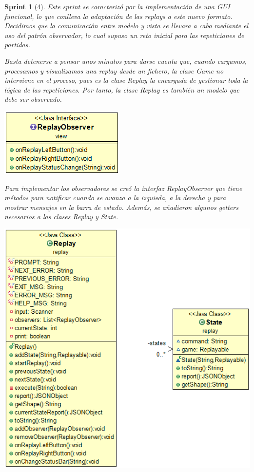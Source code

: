 \documentclass{article}
\theoremstyle{break}
\newtheorem*{sprint}{Sprint}
\begin{document}
\begin{sprint}[4]

Este sprint se caracterizó por la implementación de una GUI funcional, lo que conlleva la adaptación de las \textit{replays} a este nuevo formato. Decidimos que la comunicación entre modelo y vista se llevara a cabo mediante el uso del patrón observador, lo cual supuso un reto inicial para las repeticiones de partidas.

Basta detenerse a pensar unos minutos para darse cuenta que, cuando cargamos, procesamos y visualizamos una \textit{replay} desde un fichero, la clase \textit{Game} no interviene en el proceso, pues es la clase \textit{Replay} la encargada de gestionar toda la lógica de las repeticiones. Por tanto, la clase \textit{Replay} es también un modelo que debe ser observado.

\begin{center}
\includegraphics[scale=0.5]{rolit-observer-sprint4.png}
\end{center}

Para implementar los observadores se creó la interfaz \textit{ReplayObserver} que tiene métodos para notificar cuando se avanza a la izquieda, a la derecha y para mostrar mensajes en la barra de estado. Además, se añadieron algunos getters necesarios a las clases \textit{Replay} y \textit{State}.

\begin{center}
\includegraphics[scale=0.5]{replay-state-sprint-4.png}
\end{center}

\end{sprint}
\end{document}
